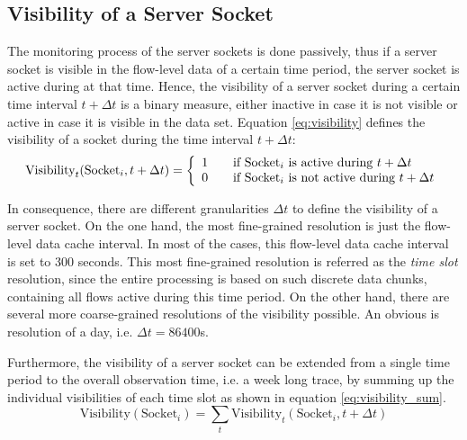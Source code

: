\subsection{Visibility of a Server Socket\label{subsection:visibility}}

The monitoring process of the \glspl{server socket} is done passively, thus if a
\gls{server socket} is visible in the flow-level data of a certain time period,
the \gls{server socket} is active during at that time. Hence, the visibility of
a \gls{server socket} during a certain time interval $t+\Delta{t}$ is a binary
measure, either inactive in case it is not visible or active in case it is
visible in the data set. Equation \ref{eq:visibility} defines the visibility of
a socket during the time interval $t+\Delta{t}$:
\begin{equation}
	\text{Visibility}_t(\text{Socket}_i,t+\Delta{t}) = \left\{
	\begin{array}{l l}
		1 & \quad \text{if $\text{Socket}_i$ is active during $t+\Delta{t}$}\\
		0 & \quad \text{if $\text{Socket}_i$ is not active during $t+\Delta{t}$}\\
	\end{array}
	\right.
	\label{eq:visibility}
\end{equation}

In consequence, there are different granularities $\Delta{t}$ to define the
visibility of a \gls{server socket}. On the one hand, the most fine-grained
resolution is just the flow-level data cache interval. In most of the cases,
this flow-level data cache interval is set to 300 seconds. This most
fine-grained resolution is referred as the \emph{time slot} resolution, since
the entire processing is based on such discrete data chunks, containing all
flows active during this time period.
On the other hand, there are several more coarse-grained resolutions of the
visibility possible. An obvious is resolution of a day, i.e.
$\Delta{t} = 86400$s.

Furthermore, the visibility of a \gls{server socket} can be extended from a
single time period to the overall observation time, i.e. a week long trace, by
summing up the individual visibilities of each time slot as shown in equation
\ref{eq:visibility_sum}.
\begin{equation}
	\text{Visibility}(\text{Socket}_i) = \sum_{t} \text{Visibility}_t(\text{Socket}_i,t+\Delta{t})
	\label{eq:visibility_sum}
\end{equation}

